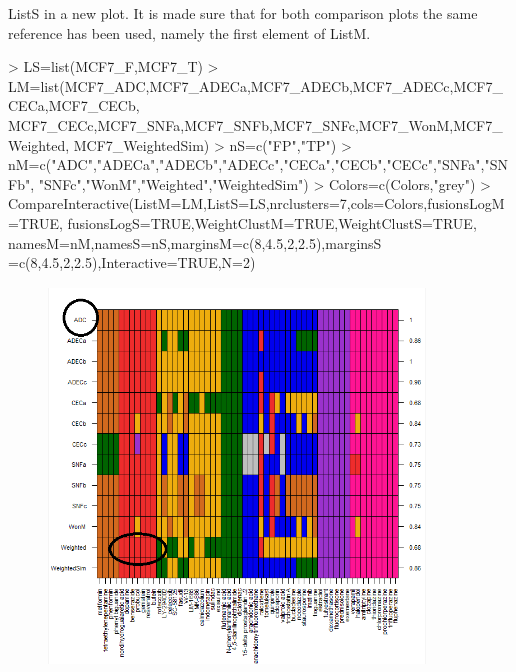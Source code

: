 \documentclass[a4paper]{article}
\begin{document}
ListS in a new plot. It is made sure that for both comparison plots the same
reference has been used, namely the first element of ListM.
\begin{Schunk}
\begin{Sinput}
> LS=list(MCF7_F,MCF7_T)
> LM=list(MCF7_ADC,MCF7_ADECa,MCF7_ADECb,MCF7_ADECc,MCF7_CECa,MCF7_CECb,
 		MCF7_CECc,MCF7_SNFa,MCF7_SNFb,MCF7_SNFc,MCF7_WonM,MCF7_Weighted,
 		MCF7_WeightedSim)
> nS=c("FP","TP")
> nM=c("ADC","ADECa","ADECb","ADECc","CECa","CECb","CECc","SNFa","SNFb",
 		"SNFc","WonM","Weighted","WeightedSim")
> Colors=c(Colors,"grey")
> CompareInteractive(ListM=LM,ListS=LS,nrclusters=7,cols=Colors,fusionsLogM=TRUE,
                    fusionsLogS=TRUE,WeightClustM=TRUE,WeightClustS=TRUE,
                    namesM=nM,namesS=nS,marginsM=c(8,4.5,2,2.5),marginsS
                    =c(8,4.5,2,2.5),Interactive=TRUE,N=2)
\end{Sinput}
\end{Schunk}
\newpage
\begin{figure}[H]  
\centering
\includegraphics[width=10cm,height=10cm]{Interactive.png}
\end{figure}
\end{document}
